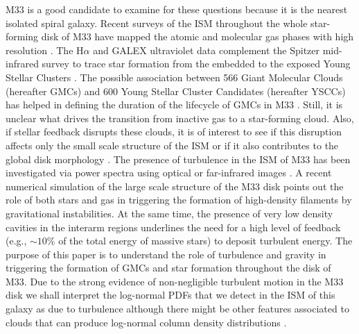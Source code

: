 \documentclass{aa}
\begin{document}
M33 is a good candidate to examine for these questions because it is the nearest isolated spiral
galaxy. Recent surveys of the  ISM throughout the whole star-forming 
disk of M33 have mapped the atomic and molecular gas phases with high resolution
\citep{2012A&A...542A.108G,druard14,2014A&A...572A..23C}. The H$\alpha$
and GALEX ultraviolet data complement the Spitzer mid-infrared survey to trace
star formation from the embedded to the exposed Young Stellar Clusters 
\citep{2009A&A...493..453V,2011A&A...534A..96S}. The possible association between 566  Giant
Molecular Clouds (hereafter GMCs)
and 600 Young Stellar Cluster Candidates (hereafter YSCCs) has helped in defining the
duration of the lifecycle of
GMCs in M33 \citep{2017A&A...601A.146C}.  Still, it is unclear what drives the transition
from inactive gas to a star-forming cloud. Also, if stellar feedback disrupts these clouds, it
is  of interest to see  if this disruption affects only the small scale structure
of the ISM or if it also contributes to the global disk morphology
\citep{2000ApJ...540..797W}. The presence of turbulence in the ISM of M33 has been
investigated via power spectra using optical or far-infrared images
\citep{2003ApJ...593..333E,2012A&A...539A..67C}.
A recent numerical simulation of the large scale structure of the M33 disk
\citep{2018MNRAS.tmp.1241D} points out the role of both stars and gas in
triggering the formation of high-density filaments by gravitational instabilities.
At the same time, the presence of very low density cavities in the interarm
regions underlines the need for a high level of feedback (e.g., $\sim10$\% of the
total energy of massive stars) to deposit turbulent energy. 
The purpose of this paper is to understand
the role of turbulence and gravity in triggering the formation of GMCs and
star formation throughout the disk of M33.
Due to the strong evidence of non-negligible turbulent motion in the M33 disk we shall
interpret the log-normal PDFs that we detect in the ISM of this galaxy as due to
turbulence although  there might be other features associated to clouds that can
produce log-normal column density distributions \citep{2010MNRAS.408.1089T}.   
 
\end{document}
